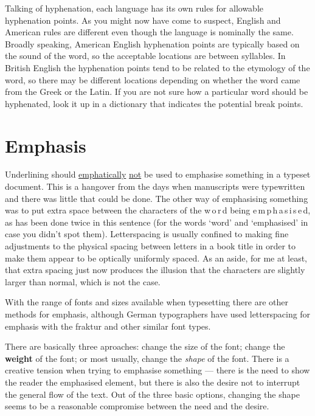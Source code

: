\documentclass[10pt,a4paper,oneside,extrafontsizes]{memoir}%
\begin{document}

\begin{paracol}{2}
\switchEng
    Talking of hyphenation,
 each language has its own rules for allowable
hyphenation points. As you might now have come to suspect, English and 
American rules are different even though the language is nominally the same.
Broadly speaking, American English hyphenation points are typically based on
the sound of the word, so the acceptable locations are between syllables.
In British English the hyphenation points tend to be related to the
etymology of the word, so there may be different locations depending on 
whether the word came from the Greek or the Latin. If you are not sure
how a particular word should be hyphenated, look it up in a dictionary
that indicates the potential break points.
\end{paracol}

\section{Emphasis}

\begin{paracol}{2}
\switchEng
    Underlining should \underline{emphatically} \underline{not} be
used to emphasise something in a typeset document. This is a hangover
from the days when manuscripts were typewritten and there was little
that could be done. The other way of emphasising something was to
put extra space between the characters of the w\,o\,r\,d being
e\,m\,p\,h\,a\,s\,i\,s\,e\,d, as has been done twice in this sentence
(for the words `word' and `emphasised' in case you didn't spot them).
Letterspacing is usually confined to making fine adjustments to the 
physical spacing between letters in a book
title in order to make them appear to be optically uniformly spaced. 
As an aside, for me at least, that extra spacing just now produces the 
illusion that the
characters are slightly larger than normal, which is not the case.

    With the range of fonts and sizes available when typesetting there
are other methods for emphasis, although German typographers have used
letterspacing for emphasis with the fraktur and other similar font types.

    There are basically three aproaches: 
change the {\Large size} of the font;
change the \textbf{weight} of the font; or most usually, change the
\emph{shape} of the font. There is a creative tension when trying
to emphasise something --- there is the need to show the reader the 
emphasised
element, but there is also the desire not to interrupt the general flow
of the text. Out of the three basic options, changing the shape seems
to be a reasonable compromise between the need and the desire.
\end{paracol}
\end{document}

